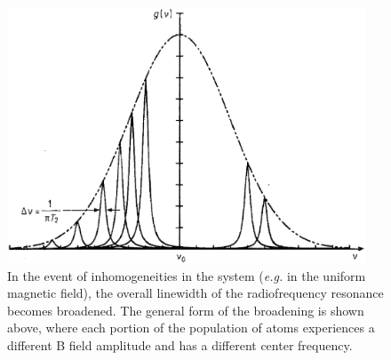 \begin{figure}[h]
\begin{center}
\includegraphics[height=3in]{figures/inhomogeneous.eps}
\caption{\small{In the event of inhomogeneities in the system (\emph{e.g.} in the uniform magnetic field), the overall linewidth of the radiofrequency resonance becomes broadened. The general form of the broadening is shown above, where each portion of the population of atoms experiences a different B field amplitude and has a different center frequency.}}
\label{fig:inhomo}
\end{center}
\end{figure}